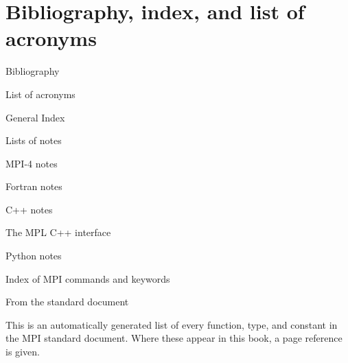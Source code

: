 \documentclass[11pt,letterpaper,twoside,openany]{boek3}
\begin{document}



\part {Bibliography, index, and list of acronyms}

 {Bibliography}



\vfill\pagebreak

 {List of acronyms}

\def\acitem#1#2{\item[#1] #2}
\def\acitemi#1#2#3{\item[#1]{#2}\index{#1|see{#3}}}

\begin{multicols}{2}
\begin{description}

\end{description}
\end{multicols}

 {General Index}


\printindex

 {Lists of notes}

 {MPI-4 notes}

\listofmpifournote
\vfill\hbox{}

 {Fortran notes}

\listoffortrannote
\vfill\hbox{}

 {C++ notes}

\listofcppnote
\vfill\hbox{}

 {The MPL C++ interface}
\label{sec:idx:mpl}

\listofmplnote
\vfill\hbox{}

 {Python notes}

\listofpythonnote

 {Index of MPI commands and keywords}

\begin{multicols*}{2}
\printindex[mpi]
\end{multicols*}

 {From the standard document}

This is an automatically generated list of every
function, type, and constant in the MPI standard document.
Where these appear in this book, a page reference is given.
\end{document}
